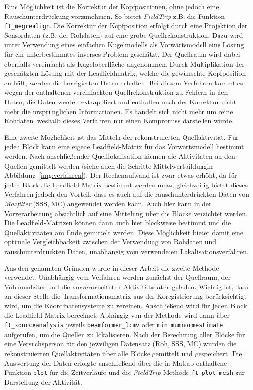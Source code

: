 \documentclass[doc,a4paper,12pt]{apa6}
\begin{document}
Eine Möglichkeit ist die Korrektur der Kopfpositionen, ohne jedoch eine Rauschunterdrückung vorzunehmen. So bietet \emph{FieldTrip} z.B. die Funktion \texttt{ft\_megrealign}. Die Korrektur der Kopfposition erfolgt durch eine Projektion der Sensordaten (z.B. der Rohdaten) auf eine grobe Quellrekonstruktion. Dazu wird unter Verwendung eines einfachen Kugelmodells als Vorwärtsmodell eine Lösung für ein unterbestimmtes inverses Problem geschätzt. Der Quellraum wird dabei ebenfalls vereinfacht als Kugeloberfläche angenommen. Durch Multiplikation der geschätzten Lösung mit der Leadfieldmatrix, welche die gewünschte Kopfposition enthält, werden die korrigierten Daten erhalten. Bei diesem Verfahren kommt es wegen der enthaltenen vereinfachten Quellrekonstruktion zu Fehlern in den Daten, die Daten werden extrapoliert und enthalten nach der Korrektur nicht mehr die ursprünglichen Informationen. Es handelt sich nicht mehr um reine Rohdaten, weshalb dieses Verfahren nur einen Kompromiss darstellen würde.

Eine zweite Möglichkeit ist das Mitteln der rekonstruierten Quellaktivität. Für jeden Block kann eine eigene Leadfield-Matrix für das Vorwärtsmodell bestimmt werden. Nach anschließender Quelllokalisation können die Aktivitäten an den Quellen gemittelt werden (siehe auch die Schritte \glqq Mittelwertbildung\grqq in Abbildung~\ref{img:verfahren}). Der Rechenaufwand ist zwar etwas erhöht, da für jeden Block die Leadfield-Matrix bestimmt werden muss, gleichzeitig bietet dieses Verfahren jedoch den Vorteil, dass es auch auf die rauschunterdrückten Daten von \emph{Maxfilter} (SSS, MC) angewendet werden kann. Auch hier kann in der Vorverarbeitung absichtlich auf eine Mittelung über die Blöcke verzichtet werden. Die Leadfield-Matrizen können dann auch hier blockweise bestimmt und die Quellaktivitäten am Ende gemittelt werden. Diese Möglichkeit bietet damit eine optimale Vergleichbarkeit zwischen der Verwendung von Rohdaten und rauschunterdrückten Daten, unabhängig vom verwendeten Lokalisationsverfahren.

Aus den genannten Gründen wurde in dieser Arbeit die zweite Methode verwendet. Unabhängig vom Verfahren werden zunächst der Quellraum, der Volumenleiter und die vorverarbeiteten Aktivitätsdaten geladen. Wichtig ist, dass an dieser Stelle die Transformationsmatrix aus der Koregistrierung berücksichtigt wird, um die Koordinatensysteme zu vereinen. Anschließend wird für jeden Block die Leadfield-Matrix berechnet. Abhängig von der Methode wird dann über \texttt{ft\_sourceanalysis} jeweils \texttt{beamformer\_lcmv} oder \texttt{minimumnormestimate} aufgerufen, um die Quellen zu lokalisieren. Nach der Berechnung aller Blöcke für eine Versuchsperson für den jeweiligen Datensatz (Roh, SSS, MC) wurden die rekonstruierten Quellaktivitäten über alle Blöcke gemittelt und gespeichert. Die Auswertung der Daten erfolgte anschließend über die in Matlab enthaltene Funktion \texttt{plot} für die Zeitverläufe und die \emph{FieldTrip}-Methode \texttt{ft\_plot\_mesh} zur Darstellung der Aktivität.
\end{document}
